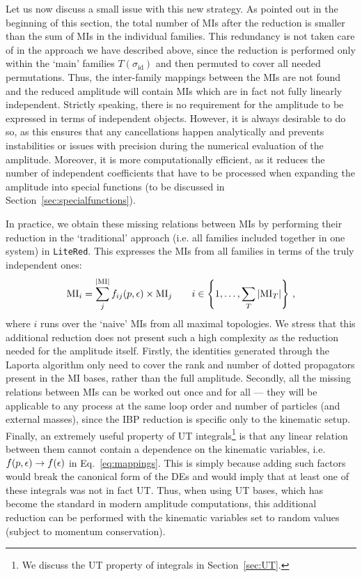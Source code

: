 \documentclass[main.tex]{subfiles}
\begin{document}
Let us now discuss a small issue with this new strategy. As pointed out in the beginning of this section, the total number of MIs after the reduction is smaller than the sum of MIs in the individual families. This redundancy is not taken care of in the approach we have described above, since the reduction is performed only within the ‘main’ families $T(\sigma_\text{id})$ and then permuted to cover all needed permutations. Thus, the inter-family mappings between the MIs are not found and the reduced amplitude will contain MIs which are in fact not fully linearly independent. Strictly speaking, there is no requirement for the amplitude to be expressed in terms of independent objects. However, it is always desirable to do so, as this ensures that any cancellations happen analytically and prevents instabilities or issues with precision during the numerical evaluation of the amplitude. Moreover, it is more computationally efficient, as it reduces the number of independent coefficients that have to be processed when expanding the amplitude into special functions (to be discussed in Section~\ref{sec:specialfunctions}).

In practice, we obtain these missing relations between MIs by performing their reduction in the `traditional' approach (i.e. all families included together in one system) in \texttt{LiteRed}. This expresses the MIs from all families in terms of the truly independent ones:
\begin{equation} \label{eq:mappings}
    \text{MI}_{i} = \sum_j^{|\text{MI}|} f_{ij}(p, \epsilon) \times \text{MI}_j \qquad i \in \left\{1, \ldots, \sum_T |\text{MI}_T|\right\}\,,
\end{equation}
where $i$ runs over the `naive' MIs from all maximal topologies. We stress that this additional reduction does not present such a high complexity as the reduction needed for the amplitude itself. Firstly, the identities generated through the Laporta algorithm only need to cover the rank and number of dotted propagators present in the MI bases, rather than the full amplitude. Secondly, all the missing relations between MIs can be worked out once and for all --- they will be applicable to any process at the same loop order and number of particles (and external masses), since the IBP reduction is specific only to the kinematic setup. Finally, an extremely useful property of UT integrals\footnote{We discuss the UT property of integrals in Section~\ref{sec:UT}.} is that any linear relation between them cannot contain a dependence on the kinematic variables, i.e. $f(p, \epsilon) \rightarrow f(\epsilon)$ in Eq.~\ref{eq:mappings}. This is simply because adding such factors would break the canonical form of the DEs and would imply that at least one of these integrals was not in fact UT. Thus, when using UT bases, which has become the standard in modern amplitude computations, this additional reduction can be performed with the kinematic variables set to random values (subject to momentum conservation). 
\end{document}
